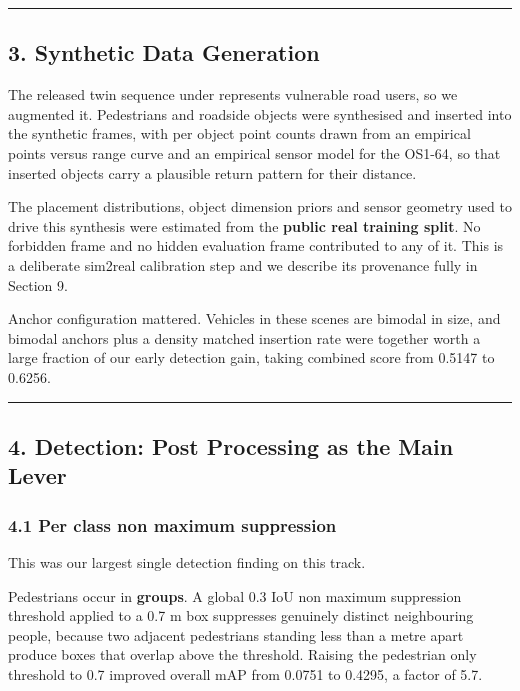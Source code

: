 \documentclass[
  10pt,
]{article}
\begin{document}
\begin{center}\rule{0.5\linewidth}{0.5pt}\end{center}

\subsection{3. Synthetic Data
Generation}\label{synthetic-data-generation}

The released twin sequence under represents vulnerable road users, so we
augmented it. Pedestrians and roadside objects were synthesised and
inserted into the synthetic frames, with per object point counts drawn
from an empirical points versus range curve and an empirical sensor
model for the OS1-64, so that inserted objects carry a plausible return
pattern for their distance.

The placement distributions, object dimension priors and sensor geometry
used to drive this synthesis were estimated from the \textbf{public real
training split}. No forbidden frame and no hidden evaluation frame
contributed to any of it. This is a deliberate sim2real calibration step
and we describe its provenance fully in Section 9.

Anchor configuration mattered. Vehicles in these scenes are bimodal in
size, and bimodal anchors plus a density matched insertion rate were
together worth a large fraction of our early detection gain, taking
combined score from 0.5147 to 0.6256.

\begin{center}\rule{0.5\linewidth}{0.5pt}\end{center}

\subsection{4. Detection: Post Processing as the Main
Lever}\label{detection-post-processing-as-the-main-lever}

\subsubsection{4.1 Per class non maximum
suppression}\label{per-class-non-maximum-suppression}

This was our largest single detection finding on this track.

Pedestrians occur in \textbf{groups}. A global 0.3 IoU non maximum
suppression threshold applied to a 0.7 m box suppresses genuinely
distinct neighbouring people, because two adjacent pedestrians standing
less than a metre apart produce boxes that overlap above the threshold.
Raising the pedestrian only threshold to 0.7 improved overall mAP from
0.0751 to 0.4295, a factor of 5.7.
\end{document}

